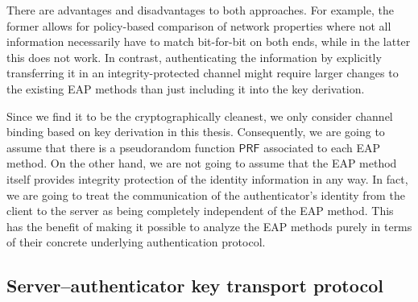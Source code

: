 There are advantages and disadvantages to both approaches.
For example,
the former allows for policy-based comparison of network properties where not all information necessarily have to match bit-for-bit on both ends,
while in the latter this does not work.
In contrast,
authenticating the information by explicitly transferring it in an integrity-protected channel might require larger changes to the existing EAP methods than just including it into the key derivation.

Since we find it to be the cryptographically cleanest,
we only consider channel binding based on key derivation in this thesis.
Consequently,
we are going to assume that there is a pseudorandom function $\mathsf{PRF}$ associated to each EAP method.
On the other hand,
we are not going to assume that the EAP method itself provides integrity protection of the identity information in any way.
In fact,
we are going to treat the communication of the authenticator's identity from the client to the server as being completely independent of the EAP method.
This has the benefit of making it possible to analyze the EAP methods purely in terms of their concrete underlying authentication protocol.




\subsection{Server--authenticator key transport protocol}\label{sec:generic_composition_results:modeling_EAP:AAA}

